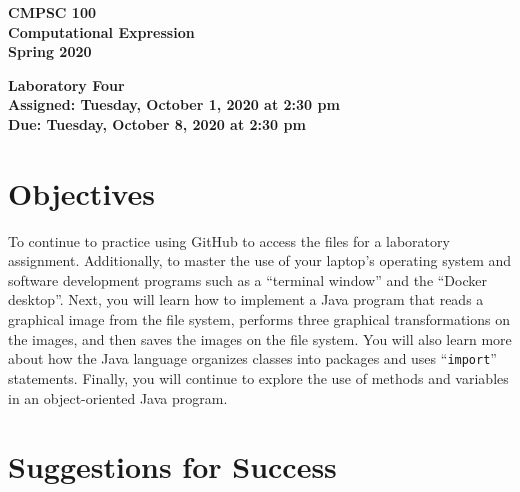 \documentclass[11pt]{article}
\newcommand{\assignmentduedate}{October 8}
\newcommand{\assignmentassignedate}{October 1}
\newcommand{\assignmentnumber}{Four}
\newcommand{\labyear}{2020}
\newcommand{\labday}{Tuesday}
\newcommand{\labtime}{2:30 pm}
\newcommand{\assigneddate}{Assigned: \labday, \assignmentassignedate, \labyear{} at \labtime{}}
\newcommand{\duedate}{Due: \labday, \assignmentduedate, \labyear{} at \labtime{}}
\newcommand{\command}[1]{``\lstinline{#1}''}
\newcommand{\labtitle}[1]
{
  \begin{center}
    \begin{center}
      \bf
      CMPSC 100\\Computational Expression\\
      Spring 2020\\
      \medskip
    \end{center}
    \bf
    #1
  \end{center}
}
\begin{document}
\thispagestyle{empty}

\labtitle{Laboratory \assignmentnumber{} \\ \assigneddate{} \\ \duedate{}}

\section*{Objectives}


To continue to practice using GitHub to access the files for a laboratory
assignment. Additionally, to master the use of your laptop's operating system
and software development programs such as a ``terminal window'' and the ``Docker
desktop''. Next, you will learn how to implement a Java program that reads a
graphical image from the file system, performs three graphical transformations
on the images, and then saves the images on the file system. You will also learn
more about how the Java language organizes classes into packages and uses
\command{import} statements.
%
Finally, you will continue to explore the use of methods and variables in an
object-oriented Java program.

\section*{Suggestions for Success}
\end{document}
